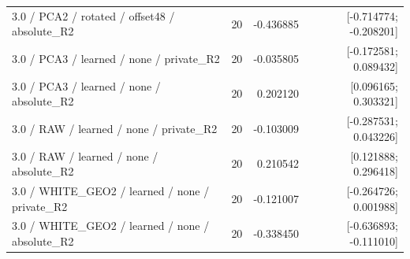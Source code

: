 \begin{longtable}{p{.56\linewidth}rrr}
3.0 / PCA2 / rotated / offset48 / absolute\_R2 & 20 & -0.436885 & [-0.714774; -0.208201] \\
3.0 / PCA3 / learned / none / private\_R2 & 20 & -0.035805 & [-0.172581; 0.089432] \\
3.0 / PCA3 / learned / none / absolute\_R2 & 20 & 0.202120 & [0.096165; 0.303321] \\
3.0 / RAW / learned / none / private\_R2 & 20 & -0.103009 & [-0.287531; 0.043226] \\
3.0 / RAW / learned / none / absolute\_R2 & 20 & 0.210542 & [0.121888; 0.296418] \\
3.0 / WHITE\_GEO2 / learned / none / private\_R2 & 20 & -0.121007 & [-0.264726; 0.001988] \\
3.0 / WHITE\_GEO2 / learned / none / absolute\_R2 & 20 & -0.338450 & [-0.636893; -0.111010] \\
\bottomrule\end{longtable}
